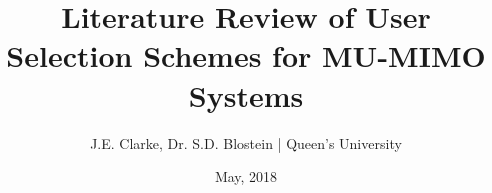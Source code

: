 \documentclass[11pt]{report}
\title{Literature Review of User Selection Schemes for MU-MIMO Systems}
\author{J.E. Clarke, Dr. S.D. Blostein | Queen's University}
\date{May, 2018}
\begin{document}
	\maketitle
	\newpage
    	
	\newpage	
 	\begingroup
 		\renewcommand{\section}[2]{}%
 		
 		
 	\endgroup
\end{document}
